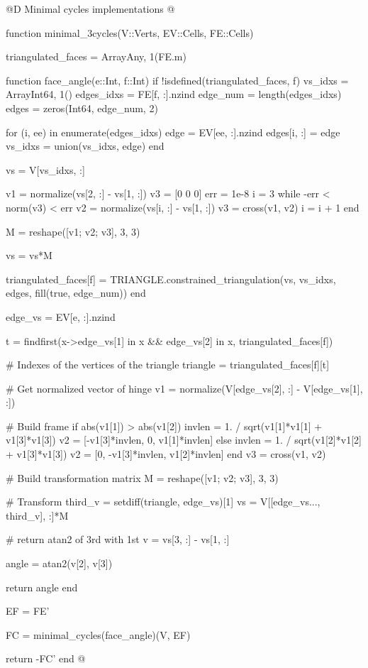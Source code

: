 @D Minimal cycles implementations
@{function minimal_3cycles(V::Verts, EV::Cells, FE::Cells)

    triangulated_faces = Array{Any, 1}(FE.m)

    function face_angle(e::Int, f::Int)
        if !isdefined(triangulated_faces, f)
            vs_idxs = Array{Int64, 1}()
            edges_idxs = FE[f, :].nzind
            edge_num = length(edges_idxs)
            edges = zeros(Int64, edge_num, 2)

            for (i, ee) in enumerate(edges_idxs)
                edge = EV[ee, :].nzind
                edges[i, :] = edge
                vs_idxs = union(vs_idxs, edge)
            end
            
            vs = V[vs_idxs, :]

            v1 = normalize(vs[2, :] - vs[1, :])
            v3 = [0 0 0]
            err = 1e-8
            i = 3
            while -err < norm(v3) < err
                v2 = normalize(vs[i, :] - vs[1, :])
                v3 = cross(v1, v2)
                i = i + 1
            end

            M = reshape([v1; v2; v3], 3, 3)

            vs = vs*M

            triangulated_faces[f] = TRIANGLE.constrained_triangulation(vs, vs_idxs, edges, fill(true, edge_num))
        end

        edge_vs = EV[e, :].nzind

        t = findfirst(x->edge_vs[1] in x && edge_vs[2] in x, triangulated_faces[f])
        
        # Indexes of the vertices of the triangle
        triangle = triangulated_faces[f][t]

        # Get normalized vector of hinge
        v1 = normalize(V[edge_vs[2], :] - V[edge_vs[1], :])

        # Build frame
        if abs(v1[1]) > abs(v1[2])
            invlen = 1. / sqrt(v1[1]*v1[1] + v1[3]*v1[3])
            v2 = [-v1[3]*invlen, 0, v1[1]*invlen]
        else
            invlen = 1. / sqrt(v1[2]*v1[2] + v1[3]*v1[3])
            v2 = [0, -v1[3]*invlen, v1[2]*invlen]
        end
        v3 = cross(v1, v2)

        # Build transformation matrix
        M = reshape([v1; v2; v3], 3, 3)

        # Transform
        third_v = setdiff(triangle, edge_vs)[1]
        vs = V[[edge_vs..., third_v], :]*M

        # return atan2 of 3rd with 1st
        v = vs[3, :] - vs[1, :]

        angle = atan2(v[2], v[3]) 

        return angle
    end

    EF = FE'

    FC = minimal_cycles(face_angle)(V, EF)

    return -FC'
end
@}
